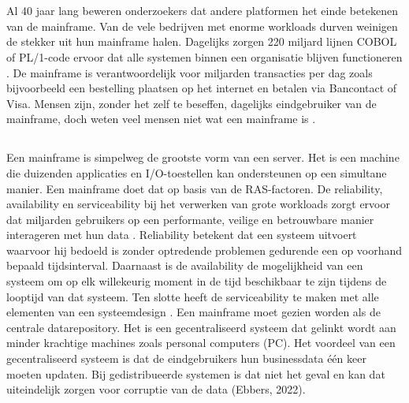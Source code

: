 
\chapter{}
\label{ch:inleiding}
Al 40 jaar lang beweren onderzoekers dat andere platformen het einde betekenen van de mainframe. Van de vele bedrijven met enorme workloads durven weinigen de stekker uit hun mainframe halen. Dagelijks zorgen 220 miljard lijnen COBOL of PL/1-code ervoor dat alle systemen binnen een organisatie blijven functioneren \autocite{Scannell2017}. De mainframe is verantwoordelijk voor miljarden transacties per dag zoals bijvoorbeeld een bestelling plaatsen op het internet en betalen via Bancontact of Visa. Mensen zijn, zonder het zelf te beseffen, dagelijks eindgebruiker van de mainframe, doch weten veel mensen niet wat een mainframe is \autocite{Scannell2017}. 


\section{}

Een mainframe is simpelweg de grootste vorm van een server. Het is een machine die duizenden applicaties en I/O-toestellen kan ondersteunen op een simultane manier. Een mainframe doet dat op basis van de RAS-factoren. De reliability, availability en serviceability bij het verwerken van grote workloads zorgt ervoor dat miljarden gebruikers op een performante, veilige en betrouwbare manier interageren met hun data \autocite{Ebbers2022}. Reliability betekent dat een systeem uitvoert waarvoor hij bedoeld is zonder optredende problemen gedurende een op voorhand bepaald tijdsinterval. Daarnaast is de availability de mogelijkheid van een systeem om op elk willekeurig moment in de tijd beschikbaar te zijn tijdens de looptijd van dat systeem. Ten slotte heeft de serviceability te maken met alle elementen van een systeemdesign \autocite{Johnson1988}. Een mainframe moet gezien worden als de centrale datarepository. Het is een gecentraliseerd systeem dat gelinkt wordt aan minder krachtige machines zoals personal computers (PC). Het voordeel van een gecentraliseerd systeem is dat de eindgebruikers hun businessdata één keer moeten updaten. Bij gedistribueerde systemen is dat niet het geval en kan dat uiteindelijk zorgen voor corruptie van de data (Ebbers, 2022).

